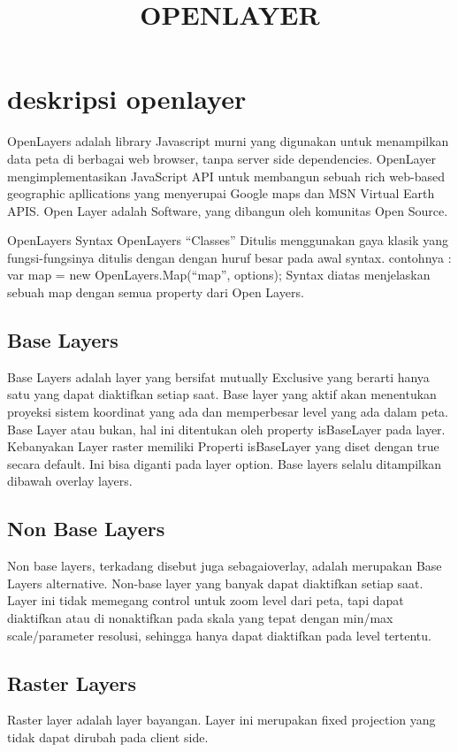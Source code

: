 \documentclass{article}
\title{OPENLAYER}
\begin{document}
\maketitle

\section{deskripsi openlayer}
OpenLayers adalah library Javascript murni yang digunakan untuk menampilkan data peta di berbagai web browser, tanpa server side dependencies.
OpenLayer mengimplementasikan JavaScript API untuk membangun sebuah rich web-based geographic apllications yang menyerupai Google maps dan MSN Virtual Earth APIS.
Open Layer adalah Software, yang dibangun oleh komunitas Open Source.
  
OpenLayers Syntax
OpenLayers “Classes”
Ditulis menggunakan gaya klasik yang fungsi-fungsinya ditulis dengan dengan huruf besar pada awal syntax.
contohnya : var map = new OpenLayers.Map(“map”, options);
Syntax diatas menjelaskan sebuah map dengan semua property dari Open Layers. 
  
\subsection{Base Layers}
 Base Layers adalah layer yang bersifat mutually Exclusive yang berarti hanya satu yang dapat diaktifkan setiap saat.
 Base layer yang aktif akan menentukan proyeksi sistem koordinat yang ada dan memperbesar level yang ada dalam peta. 
 Base Layer atau bukan, hal ini ditentukan oleh property isBaseLayer pada layer. Kebanyakan Layer raster memiliki Properti isBaseLayer yang diset dengan true secara default. 
 Ini bisa diganti pada layer option. Base layers selalu ditampilkan dibawah overlay layers.

\subsection{Non Base Layers}
Non base layers, terkadang disebut juga sebagaioverlay, adalah merupakan Base Layers alternative. Non-base layer yang banyak dapat diaktifkan setiap saat.
Layer ini tidak memegang control untuk zoom level dari peta, tapi dapat diaktifkan atau di nonaktifkan pada skala yang tepat dengan min/max scale/parameter resolusi, sehingga hanya dapat diaktifkan pada level tertentu.

\subsection {Raster Layers}
Raster layer adalah layer bayangan. Layer ini merupakan fixed projection yang tidak dapat dirubah pada client side.
\end{document}
